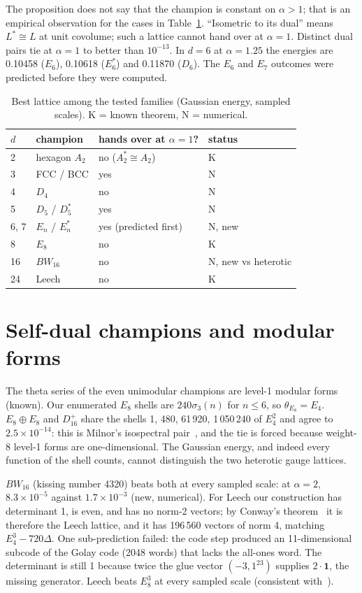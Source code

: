 \documentclass[aps,prd,twocolumn,superscriptaddress,nofootinbib,showkeys]{revtex4-2}
\begin{document}
The proposition does not say that the champion is constant on $\alpha>1$; that is an empirical observation for the cases in Table~\ref{tab:chain}. ``Isometric to its dual'' means $L^*\cong L$ at unit covolume; such a lattice cannot hand over at $\alpha=1$. Distinct dual pairs tie at $\alpha=1$ to better than $10^{-13}$. In $d=6$ at $\alpha=1.25$ the energies are 0.10458 ($E_6$), 0.10618 ($E_6^*$) and 0.11870 ($D_6$). The $E_6$ and $E_7$ outcomes were predicted before they were computed.

\begin{table}[b]
\caption{Best lattice among the tested families (Gaussian energy, sampled scales). K = known theorem, N = numerical.}
\label{tab:chain}
\begin{ruledtabular}\footnotesize
\begin{tabular}{llll}
$d$ & champion & hands over at $\alpha=1$? & status\\ \hline
2 & hexagon $A_2$ & no ($A_2^*\cong A_2$) & K~\cite{Mon}\\
3 & FCC / BCC & yes & N\\
4 & $D_4$ & no & N\\
5 & $D_5$ / $D_5^*$ & yes & N\\
6, 7 & $E_n$ / $E_n^*$ & yes (predicted first) & N, new\\
8 & $E_8$ & no & K~\cite{CKMRV}\\
16 & $BW_{16}$ & no & N, new vs heterotic\\
24 & Leech & no & K~\cite{CKMRV}
\end{tabular}
\end{ruledtabular}
\end{table}

\section{Self-dual champions and modular forms}
The theta series of the even unimodular champions are level-1 modular forms~\cite{CS} (known). Our enumerated $E_8$ shells are $240\sigma_3(n)$ for $n\le6$, so $\theta_{E_8}=E_4$. $E_8\oplus E_8$ and $D_{16}^+$ share the shells 1, 480, 61\,920, 1\,050\,240 of $E_4^2$ and agree to $2.5\times10^{-14}$: this is Milnor's isospectral pair~\cite{Mil}, and the tie is forced because weight-8 level-1 forms are one-dimensional. The Gaussian energy, and indeed every function of the shell counts, cannot distinguish the two heterotic gauge lattices.

$BW_{16}$ (kissing number 4320) beats both at every sampled scale: at $\alpha=2$, $8.3\times10^{-5}$ against $1.7\times10^{-3}$ (new, numerical). For Leech our construction has determinant 1, is even, and has no norm-2 vectors; by Conway's theorem~\cite{Con} it is therefore the Leech lattice, and it has 196\,560 vectors of norm 4, matching $E_4^3-720\Delta$. One sub-prediction failed: the code step produced an 11-dimensional subcode of the Golay code (2048 words) that lacks the all-ones word. The determinant is still 1 because twice the glue vector $(-3,1^{23})$ supplies $2\cdot\mathbf 1$, the missing generator. Leech beats $E_8^3$ at every sampled scale (consistent with~\cite{CKMRV}).
\end{document}
